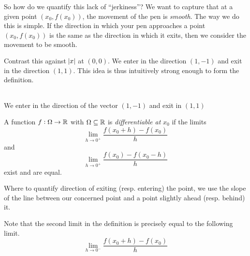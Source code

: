 So how do we quantify this lack of ``jerkiness''? We want to capture that at a given point $(x_0, f(x_0))$, the movement of the pen is \emph{smooth}. The way we do this is simple. If the direction in which your pen approaches a point $(x_0 , f(x_0))$ is the same as the direction in which it exits, then we consider the movement to be smooth.

Contrast this against $\abs{x}$ at $(0, 0)$. We enter in the direction $(1, -1)$ and exit in the direction $(1, 1)$. This idea is thus intuitively strong enough to form the definition.

\begin{center}
\\
We enter in the direction of the vector $(1, -1)$ and exit in $(1, 1)$
\end{center}

\begin{SNP}{\dfn}{A function $f: \Omega \rightarrow \mathbb{R}$ with $\Omega \subseteq \mathbb{R}$ is \emph{differentiable at} $x_0$ if the limits
$$
\lim_{h\rightarrow0^+} \frac{f(x_0 + h) - f(x_0)}{h}
$$
and
$$
\lim_{h\rightarrow0^+} \frac{f(x_0) - f(x_0 - h)}{h}
$$
exist and are equal.}
\end{SNP}
Where to quantify direction of exiting (resp. entering) the point, we use the slope of the line between our concerned point and a point slightly ahead (resp. behind) it.

Note that the second limit in the definition is precisely equal to the following limit.
$$
\lim_{h\rightarrow0^-}\frac{f(x_0 + h) - f(x_0)}{h}
$$


